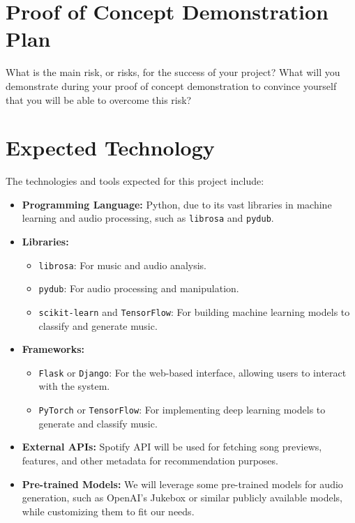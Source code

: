 \documentclass{article}
\begin{document}
\section{Proof of Concept Demonstration Plan}

What is the main risk, or risks, for the success of your project?  What will you
demonstrate during your proof of concept demonstration to convince yourself that
you will be able to overcome this risk?

\section{Expected Technology}

The technologies and tools expected for this project include:

\begin{itemize}
    \item \textbf{Programming Language:} Python, due to its vast libraries in machine learning and audio processing, such as \texttt{librosa} and \texttt{pydub}.
    \item \textbf{Libraries:} 
        \begin{itemize}
            \item \texttt{librosa}: For music and audio analysis.
            \item \texttt{pydub}: For audio processing and manipulation.
            \item \texttt{scikit-learn} and \texttt{TensorFlow}: For building machine learning models to classify and generate music.
        \end{itemize}
    \item \textbf{Frameworks:} 
        \begin{itemize}
            \item \texttt{Flask} or \texttt{Django}: For the web-based interface, allowing users to interact with the system.
            \item \texttt{PyTorch} or \texttt{TensorFlow}: For implementing deep learning models to generate and classify music.
        \end{itemize}
    \item \textbf{External APIs:} Spotify API will be used for fetching song previews, features, and other metadata for recommendation purposes.
    \item \textbf{Pre-trained Models:} We will leverage some pre-trained models for audio generation, such as OpenAI's Jukebox or similar publicly available models, while customizing them to fit our needs.
\end{itemize}
\end{document}
